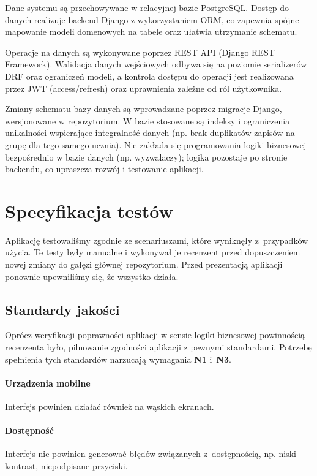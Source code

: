 \documentclass{article}
\begin{document}
Dane systemu są przechowywane w relacyjnej bazie PostgreSQL. Dostęp do danych realizuje backend Django
z wykorzystaniem ORM, co zapewnia spójne mapowanie modeli domenowych na tabele oraz ułatwia utrzymanie schematu.

Operacje na danych są wykonywane poprzez REST API (Django REST Framework). Walidacja danych wejściowych odbywa się
na poziomie serializerów DRF oraz ograniczeń modeli, a kontrola dostępu do operacji jest realizowana przez JWT
(access/refresh) oraz uprawnienia zależne od ról użytkownika.

Zmiany schematu bazy danych są wprowadzane poprzez migracje Django, wersjonowane w repozytorium. W bazie stosowane
są indeksy i ograniczenia unikalności wspierające integralność danych (np. brak duplikatów zapisów na grupę
dla tego samego ucznia). Nie zakłada się programowania logiki biznesowej bezpośrednio w bazie danych (np. wyzwalaczy);
logika pozostaje po stronie backendu, co upraszcza rozwój i testowanie aplikacji.

\section{Specyfikacja testów}
Aplikację testowaliśmy zgodnie ze scenariuszami, które wyniknęły z~przypadków użycia.
Te testy były manualne i wykonywał je recenzent przed dopuszczeniem nowej
zmiany do gałęzi głównej repozytorium. Przed prezentacją aplikacji ponownie
upewniliśmy się, że wszystko działa.

\subsection{Standardy jakości}
Oprócz weryfikacji poprawności aplikacji w sensie logiki biznesowej powinnością
recenzenta było, pilnowanie zgodności aplikacji z pewnymi standardami. Potrzebę
spełnienia tych standardów narzucają wymagania \textbf{N1} i~\textbf{N3}.

\paragraph{Urządzenia mobilne} Interfejs powinien działać również na wąskich ekranach.
\paragraph{Dostępność} Interfejs nie powinien generować błędów związanych z~dostępnością,
    np. niski kontrast, niepodpisane przyciski.
\end{document}
